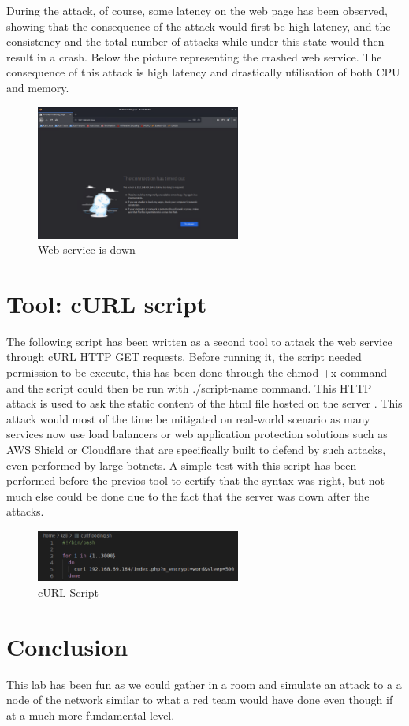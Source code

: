 During the attack, of course, some latency on the web page has been observed,
showing that the consequence of the attack would first be high latency, and the
consistency and the total number of attacks while under this state would then
result in a crash. Below the picture representing the crashed web service. The
consequence of this attack is high latency and drastically utilisation of both
CPU and memory.

\begin{figure}[H]
  \centering
  \includegraphics[width=0.6\textwidth]{figures/ddossonlywindow}
  \caption{Web-service is down}
  \label{f:web-service-down}
\end{figure}

\section{Tool: cURL script}
\label{s:Tool-curl-script}

The following script has been written as a second tool to attack the web service
through cURL HTTP GET requests. Before running it, the script needed permission
to be execute, this has been done through the chmod +x command and the script
could then be run with ./script-name command. This HTTP attack is used to ask
the static content of the html file hosted on the server
\citep{WhatHTTPFlood2020}. This attack would most of the time be mitigated on
real-world scenario as many services now use load balancers or web application
protection solutions such as AWS Shield or Cloudflare that are specifically
built to defend by such attacks, even performed by large botnets. A simple test
with this script has been performed before the previos tool to certify that the
syntax was right, but not much else could be done due to the fact that the
server was down after the attacks.

\begin{figure}[H]
  \centering
  \includegraphics[width=0.6\textwidth]{figures/curl-script}
  \caption{cURL Script}
  \label{f:curl-script}
\end{figure}

\section{Conclusion}
\label{s:Week3-Conclusion}
This lab has been fun as we could gather in a room and simulate an attack to a a
node of the network similar to what a red team would have done even though if at
a much more fundamental level.
